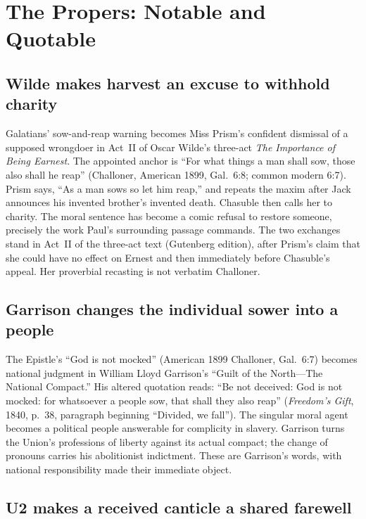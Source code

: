 \sectionguard
\section*{The Propers: Notable and Quotable}

\subsection*{Wilde makes harvest an excuse to withhold charity\enspace{}}

Galatians' sow-and-reap warning becomes Miss Prism's confident dismissal
of a supposed wrongdoer in Act~II of Oscar Wilde's three-act
\emph{The Importance of Being Earnest}. The appointed anchor is
``For what things a man shall sow, those also shall he reap''
(Challoner, American 1899, Gal.~6:8; common modern 6:7).
Prism says, ``As a man sows so let him reap,'' and repeats the maxim after
Jack announces his invented brother's invented death. Chasuble then calls
her to charity. The moral sentence has become a comic refusal to restore
someone, precisely the work Paul's surrounding passage commands.
The two exchanges stand in Act~II of the three-act text (Gutenberg
edition), after Prism's claim that she could have no effect on Ernest and
then immediately before Chasuble's appeal. Her proverbial recasting is
not verbatim Challoner.

\subsection*{Garrison changes the individual sower into a people\enspace{}}

The Epistle's ``God is not mocked'' (American 1899 Challoner, Gal.~6:7)
becomes national judgment in William Lloyd Garrison's ``Guilt of the
North---The National Compact.'' His altered quotation reads:
``Be not deceived: God is not mocked: for whatsoever a people sow, that
shall they also reap'' (\emph{Freedom's Gift}, 1840, p.~38,
paragraph beginning ``Divided, we fall''). The singular moral agent becomes
a political people answerable for complicity in slavery. Garrison turns
the Union's professions of liberty against its actual compact; the change
of pronouns carries his abolitionist indictment. These are Garrison's
words, with national responsibility made their immediate object.

\subsection*{U2 makes a received canticle a shared farewell\enspace{}}

